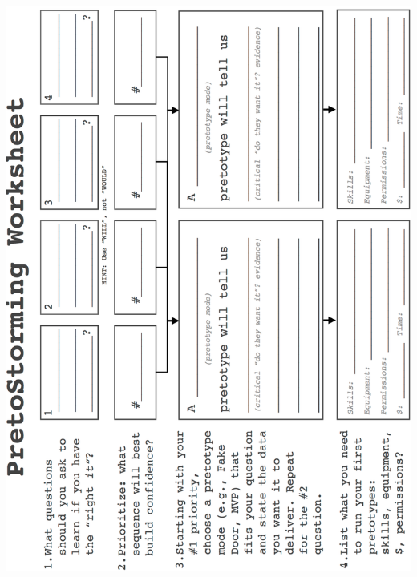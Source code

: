 \documentclass{article}
\begin{document}
\begin{center}
    \includegraphics[width=1.1\textwidth]{pretostorming.png}
\end{center}
\clearpage
\end{document}
